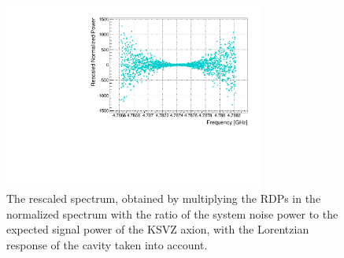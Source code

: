 \begin{figure} [htbp]
  \centering
  \includegraphics[width=8.6cm]{figures/RescaledPower_vs_Freq_Step_0100.pdf}
  \caption{
  The rescaled spectrum, obtained by multiplying the RDPs in the normalized 
spectrum with the ratio of the system noise power to the expected signal 
power of the KSVZ axion, 
with the Lorentzian response of the cavity taken into account.}
  \label{fig:rescaled_power}
\end{figure}






